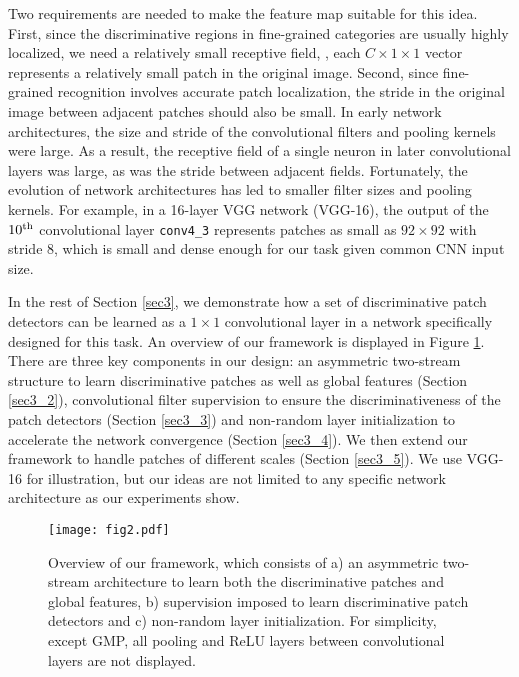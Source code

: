 \documentclass[10pt,twocolumn,letterpaper]{article}
\begin{document}
Two requirements are needed to make the feature map suitable for this idea.
First, since the discriminative regions in fine-grained categories are usually highly localized, we need a relatively
small receptive field, \ie, each $C\times1\times1$ vector represents a relatively small patch in the original image.
Second, since fine-grained recognition involves accurate patch localization, the stride in
the original image between adjacent
patches should also be small. In early network architectures, the size and stride of the
convolutional filters and pooling kernels were large. As a result, the receptive
field of a single neuron in later convolutional
layers was large, as was the stride between adjacent fields. Fortunately, the evolution of
network architectures \cite{vgg, googlenet, resnet} has led to smaller filter sizes and pooling kernels. For
example, in a 16-layer VGG network (VGG-16), the output of the $10^{\rm th}$ convolutional layer \texttt{conv4\_3}
represents patches as small as $92\times92$ with stride 8, which is small and dense enough for our task given common
CNN input size.

In the rest of Section \ref{sec3}, we demonstrate how a set of discriminative patch detectors can be
learned as a $1\times1$ convolutional layer in a network specifically designed for this task. An overview of our framework is
displayed in Figure \ref{fig2}. There are three key components in our design: an asymmetric
two-stream structure to learn discriminative patches as well as global features (Section \ref{sec3_2}), 
convolutional filter supervision to ensure the discriminativeness of the patch detectors (Section \ref{sec3_3}) and
non-random layer initialization to accelerate the network convergence (Section \ref{sec3_4}). We then extend our
framework to handle patches of different scales (Section \ref{sec3_5}). We use VGG-16 for illustration, but our ideas
are not limited to any specific network architecture as our experiments show.
\begin{figure}
\begin{center}
\texttt{[image: fig2.pdf]}
\end{center}
\vspace{-10pt}
\caption{\label{fig2} Overview of our framework, which consists of a) an asymmetric two-stream architecture to learn
both the discriminative patches and global features, b) supervision imposed to learn discriminative patch detectors and
c) non-random layer initialization. For simplicity, except GMP, all pooling and ReLU layers between
convolutional layers are not displayed.}
\end{figure}
\end{document}
